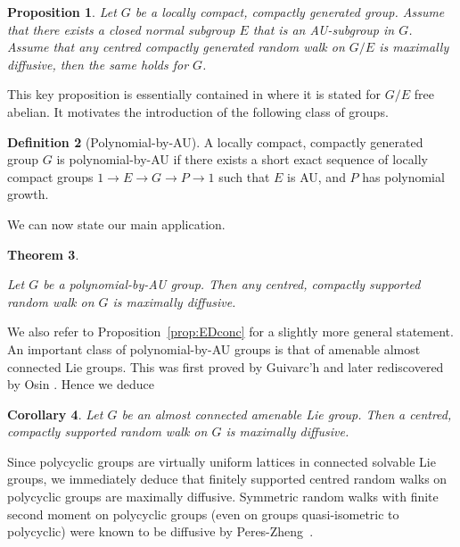 \documentclass[11pt,leqno]{article}
\theoremstyle{plain}
\newtheorem{theorem}{Theorem}[section]
\newtheorem{corollary}[theorem]{Corollary}
\newtheorem{proposition}[theorem]{Proposition}
\theoremstyle{definition}
\newtheorem{definition}[theorem]{Definition}
\theoremstyle{remark}
\numberwithin{equation}{section}
\begin{document}
\begin{proposition}\label{prop:Edoesnotcount} Let $G$ be a locally
compact, compactly generated group. Assume that there exists a closed
normal subgroup $E$ that is an AU-subgroup in $G$. Assume
that any centred compactly generated random walk on $G/E$
is maximally diffusive, then the same holds for $G$. \end{proposition}

This key proposition is essentially contained in \cite[Theorem 4]{Thompson} where it is stated for $G/E$ free abelian. It motivates the introduction of the following class of
groups.

\begin{definition}[Polynomial-by-AU] A locally compact, compactly
generated group $G$ is polynomial-by-AU if there exists a short exact
sequence of locally compact groups $1\to E\to G\to P\to1$ such that
$E$ is AU, and $P$ has polynomial growth. \end{definition}

We can now state our main application. 

\begin{theorem}\label{thmIntro:EbyP} 

Let $G$ be a polynomial-by-AU group. Then any centred, compactly
supported random walk on $G$ is maximally diffusive.

\end{theorem}

We also refer to Proposition~\ref{prop:EDconc} for a slightly more general statement.
An important class of polynomial-by-AU groups is that of amenable
almost connected Lie groups. This was first proved by Guivarc'h \cite[Proposition 5]{Guivarch80} and later rediscovered by Osin \cite{Osin}. Hence we deduce

\begin{corollary}\label{cor:amenLie} Let $G$ be an almost connected amenable Lie group.
Then a centred, compactly supported random walk on $G$ is maximally
diffusive. \end{corollary} 

Since polycyclic groups are virtually uniform lattices in connected
solvable Lie groups, we immediately deduce that finitely supported
centred random walks on polycyclic groups are maximally diffusive. Symmetric random walks with finite second moment on polycyclic groups (even on groups quasi-isometric to polycyclic) were known to be diffusive by Peres-Zheng~\cite{PeresZheng}.
\end{document}
